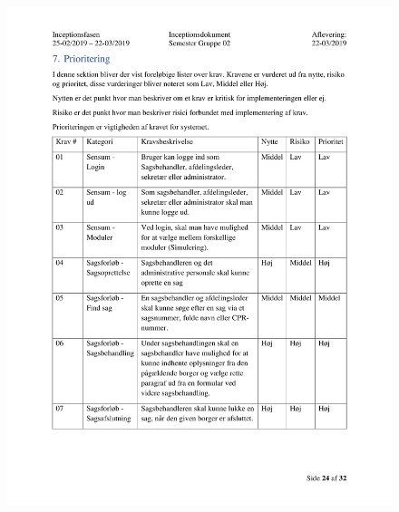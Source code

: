 \begin{figure}[hb]
  \includegraphics[scale = 0.33]{./PNG/Inceptions/Gruppe02+InceptionsDokument-25.jpg} 
\end{figure}

